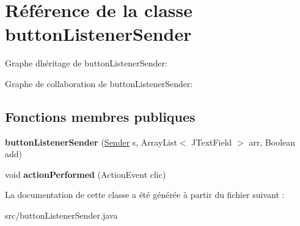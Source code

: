 \hypertarget{classbuttonListenerSender}{}\section{Référence de la classe button\+Listener\+Sender}
\label{classbuttonListenerSender}


Graphe d\textquotesingle{}héritage de button\+Listener\+Sender\+:


Graphe de collaboration de button\+Listener\+Sender\+:
\subsection*{Fonctions membres publiques}
\begin{DoxyCompactItemize}
\item 
\mbox{\label{classbuttonListenerSender_a43198bc33392260e8e08ffbda6044547}} 
{\bfseries button\+Listener\+Sender} (\hyperlink{interfaceSender}{Sender} s, Array\+List$<$ J\+Text\+Field $>$ arr, Boolean add)
\item 
\mbox{\label{classbuttonListenerSender_a10fdc446855dd380c27dc85d0c3147e8}} 
void {\bfseries action\+Performed} (Action\+Event clic)
\end{DoxyCompactItemize}


La documentation de cette classe a été générée à partir du fichier suivant \+:\begin{DoxyCompactItemize}
\item 
src/button\+Listener\+Sender.\+java\end{DoxyCompactItemize}
